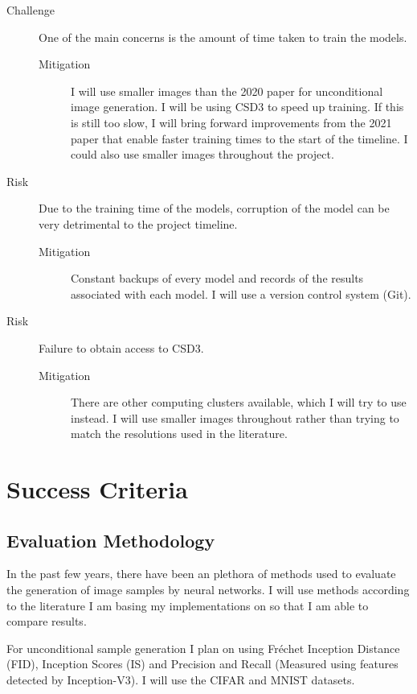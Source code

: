 \documentclass{article}
\begin{document}
\begin{description}
\item[Challenge] One of the main concerns is the amount of time taken to train the models.
\begin{description}
\item[Mitigation] I will use smaller images than the 2020 paper for unconditional image generation. I will be using CSD3 to speed up training. If this is still too slow, I will bring forward improvements from the 2021 paper that enable faster training times to the start of the timeline. I could also use smaller images throughout the project.
\end{description}
\item[Risk] Due to the training time of the models, corruption of the model can be very detrimental to the project timeline.
\begin{description}
\item[Mitigation] Constant backups of every model and records of the results associated with each model. I will use a version control system (Git).
\end{description}
\item[Risk] Failure to obtain access to CSD3.
\begin{description}
\item[Mitigation] There are other computing clusters available, which I will try to use instead. I will use smaller images throughout rather than trying to match the resolutions used in the literature.
\end{description}
\end{description}

\section{Success Criteria}

\subsection{Evaluation Methodology}

In the past few years, there have been an plethora of methods used to evaluate the generation of image samples by neural networks. I will use methods according to the literature I am basing my implementations on so that I am able to compare results.

For unconditional sample generation I plan on using Fréchet Inception Distance (FID), Inception Scores (IS) and Precision and Recall (Measured using features detected by Inception-V3). I will use the CIFAR and MNIST datasets.
\end{document}
